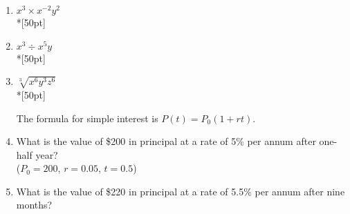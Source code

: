 \documentclass[12pt, twoside]{article}
\begin{document}
\begin{enumerate}
  \item $x^3 \times x^{-2}y^2$\\*[50pt]
  \item $x^3 \div x^{5}y$\\*[50pt]

  \item $\sqrt[3]{x^6y^3z^6}$\\*[50pt]

  The formula for simple interest is $P(t)=P_0(1+rt)$.
  \item   What is the value of \$200 in principal at a rate of 5\%  per annum after one-half year?\\
  ($P_0=200$, $r=0.05$, $t=0.5$) \vspace{2cm}
  \item   What is the value of \$220 in principal at a rate of 5.5\%  per annum after nine months?

\end{enumerate}
\end{document}
